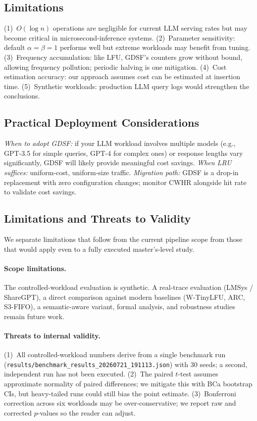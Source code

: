 \documentclass[sigconf, nonacm, review=false, screen=true]{acmart}
\begin{document}
\subsection{Limitations}
(1)~$O(\log n)$ operations are negligible for current LLM serving rates
but may become critical in microsecond-inference systems.
(2)~Parameter sensitivity: default $\alpha=\beta=1$ performs well but
extreme workloads may benefit from tuning.
(3)~Frequency accumulation: like LFU, GDSF's counters grow without bound,
allowing frequency pollution; periodic halving is one mitigation.
(4)~Cost estimation accuracy: our approach assumes cost can be estimated
at insertion time.
(5)~Synthetic workloads: production LLM query logs would strengthen the
conclusions.

\subsection{Practical Deployment Considerations}
\emph{When to adopt GDSF:} if your LLM workload involves multiple models
(e.g., GPT-3.5 for simple queries, GPT-4 for complex ones) or response
lengths vary significantly, GDSF will likely provide meaningful cost
savings. \emph{When LRU suffices:} uniform-cost, uniform-size traffic.
\emph{Migration path:} GDSF is a drop-in replacement with zero
configuration changes; monitor CWHR alongside hit rate to validate cost
savings.

\subsection{Limitations and Threats to Validity}
\label{sec:threats}
We separate limitations that follow from the current pipeline scope from
those that would apply even to a fully executed master's-level study.

\paragraph{Scope limitations.}
The controlled-workload evaluation is synthetic. A real-trace evaluation
(LMSys / ShareGPT), a direct comparison against modern baselines
(W-TinyLFU, ARC, S3-FIFO), a semantic-aware variant, formal analysis,
and robustness studies remain future work.

\paragraph{Threats to internal validity.}
(1)~All controlled-workload numbers derive from a single benchmark run
(\texttt{results/benchmark\_results\_20260721\_191113.json}) with 30
seeds; a second, independent run has not been executed.
(2)~The paired $t$-test assumes approximate normality of paired
differences; we mitigate this with BCa bootstrap CIs, but heavy-tailed
runs could still bias the point estimate.
(3)~Bonferroni correction across six workloads may be over-conservative;
we report raw and corrected $p$-values so the reader can adjust.
\end{document}
